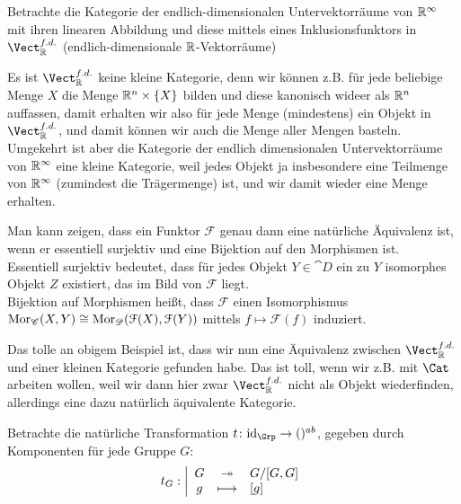     \begin{example}
        Betrachte die Kategorie der endlich-dimensionalen Untervektorräume von $\mathbb{R}^{\infty}$ mit ihren linearen Abbildung und diese mittels eines Inklusionsfunktors in $\Vect_{\R}^{f.d.}$ (endlich-dimensionale $\mathbb{R}$-Vektorräume)
    \end{example}

    \begin{oral}
        Es ist $\Vect_{\R}^{f.d.}$ keine kleine Kategorie, denn wir können z.B. für jede beliebige Menge $X$ die Menge  $\mathbb{R}^n \times \left \{X\right\} $ bilden und diese kanonisch wideer als $\mathbb{R}^n$ auffassen, damit erhalten wir also für jede Menge (mindestens) ein Objekt in $\Vect_{\R}^{f.d.}$, und damit können wir auch die Menge aller Mengen basteln. \\
        Umgekehrt ist aber die Kategorie der endlich dimensionalen Untervektorräume von $\mathbb{R}^{\infty}$ eine kleine Kategorie, weil jedes Objekt ja insbesondere eine Teilmenge von $\mathbb{R}^{\infty}$ (zumindest die Trägermenge) ist, und wir damit wieder eine Menge erhalten.
    \end{oral}

    \begin{oral}
        Man kann zeigen, dass ein Funktor $\mathcal{F}$ genau dann eine natürliche Äquivalenz ist, wenn er essentiell surjektiv  und eine Bijektion auf den Morphismen ist. \\
        Essentiell surjektiv bedeutet, dass für jedes Objekt $Y\in \cat{D}$ ein zu $Y$ isomorphes Objekt  $Z$ existiert, das im Bild von  $\mathcal{F}$ liegt. \\
        Bijektion auf Morphismen heißt, dass $\mathcal{F}$ einen Isomorphismus $\operatorname{Mor}_{\mathscr{C}}(X,Y) \cong \operatorname{Mor}_{\mathscr{D}}(\mathcal{F}(X), \mathcal{F}(Y))$ mittels $f \mapsto \mathcal{F}(f)$ induziert.
    \end{oral}

\begin{oral}
    Das tolle an obigem Beispiel ist, dass wir nun eine Äquivalenz zwischen $\Vect_{\R}^{f.d.}$ und einer kleinen Kategorie gefunden habe. Das ist toll, wenn wir z.B. mit $\Cat$ arbeiten wollen, weil wir dann hier zwar  $\Vect_{\R}^{f.d.}$ nicht als Objekt wiederfinden, allerdings eine dazu natürlich äquivalente Kategorie.
\end{oral}

\begin{example}
    Betrachte die natürliche Transformation $t\colon \id_{\Grp} \to  ()^{ab}$, gegeben durch Komponenten für jede Gruppe $G$:
        \begin{equation*}
        t_G: \left| \begin{array}{c c l} 
            G & \twoheadrightarrow & G / [G,G] \\
            g & \longmapsto &  [g]
        \end{array} \right.
    \end{equation*}
\end{example}

